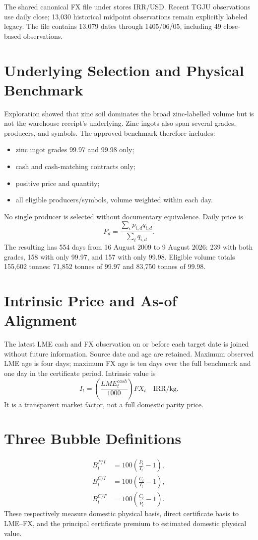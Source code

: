 \documentclass[11pt,a4paper]{article}
\begin{document}
The shared canonical FX file under  stores IRR/USD. Recent TGJU
observations use daily close; 13,030 historical
midpoint observations remain explicitly labeled legacy. The file contains 13,079 dates through
1405/06/05, including 49 close-based observations.

\section{Underlying Selection and Physical Benchmark}
Exploration showed that zinc soil dominates the broad zinc-labelled volume but is not the
warehouse receipt's underlying. Zinc ingots also span several grades, producers, and symbols.
The approved benchmark therefore includes:
\begin{itemize}
\item zinc ingot grades 99.97 and 99.98 only;
\item cash and cash-matching contracts only;
\item positive price and quantity;
\item all eligible producers/symbols, volume weighted within each day.
\end{itemize}
No single producer is selected without documentary equivalence. Daily price is
\begin{equation}P_d=\frac{\sum_i p_{i,d}q_{i,d}}{\sum_i q_{i,d}}.\end{equation}
The resulting  has 554 days from 16 August 2009 to
9 August 2026: 239 with both grades, 158 with only 99.97, and 157 with only 99.98.
Eligible volume totals 155,602 tonnes: 71,852 tonnes of 99.97 and 83,750 tonnes of 99.98.

\section{Intrinsic Price and As-of Alignment}
The latest LME cash and FX observation on or before each target date is joined without future
information. Source date and age are retained. Maximum observed LME age is four days; maximum
FX age is ten days over the full benchmark and one day in the certificate period. Intrinsic value is
\begin{equation}I_t=\left(\frac{LME^{cash}_t}{1000}\right)FX_t\quad\text{IRR/kg}.\end{equation}
It is a transparent market factor, not a full domestic parity price.

\section{Three Bubble Definitions}
\begin{align}
B^{P/I}_t&=100\left(\frac{P_t}{I_t}-1\right),\\
B^{C/I}_t&=100\left(\frac{C_t}{I_t}-1\right),\\
B^{C/P}_t&=100\left(\frac{C_t}{\widehat{P}_t}-1\right).
\end{align}
These respectively measure domestic physical basis, direct certificate basis to LME--FX, and
the principal certificate premium to estimated domestic physical value.
\end{document}
